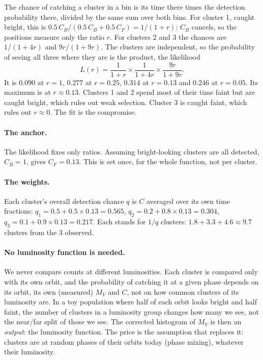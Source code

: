 \documentclass[11pt,a4paper]{article}
\newcommand{\MV}{M_V}
\begin{document}
The chance of catching a cluster in a bin is its time there times the detection probability there,
divided by the same sum over both bins. For cluster 1, caught bright, this is
$0.5\,C_B/(0.5\,C_B + 0.5\,C_F) = 1/(1+r)$: $C_B$ cancels, so the positions measure only the ratio
$r$. For clusters 2 and 3 the chances are $1/(1+4r)$ and $9r/(1+9r)$. The clusters are independent, so
the probability of seeing all three where they are is the product, the likelihood
\begin{equation}
L(r) = \frac{1}{1+r}\times\frac{1}{1+4r}\times\frac{9r}{1+9r}.
\end{equation}
It is $0.090$ at $r=1$, $0.277$ at $r=0.25$, $0.314$ at $r=0.13$ and $0.246$ at $r=0.05$. Its maximum
is at $r\approx0.13$. Clusters 1 and 2 spend most of their time faint but are caught bright, which
rules out weak selection. Cluster 3 is caught faint, which rules out $r\approx0$. The fit is the
compromise.

\paragraph{The anchor.} The likelihood fixes only ratios. Assuming bright-looking clusters are all
detected, $C_B=1$, gives $C_F = 0.13$. This is set once, for the whole function, not per cluster.

\paragraph{The weights.} Each cluster's overall detection chance $q$ is $C$ averaged over its own time
fractions: $q_1 = 0.5 + 0.5\times0.13 = 0.565$, $q_2 = 0.2 + 0.8\times0.13 = 0.304$,
$q_3 = 0.1 + 0.9\times0.13 = 0.217$. Each stands for $1/q$ clusters: $1.8 + 3.3 + 4.6 \approx 9.7$
clusters from the 3 observed.

\paragraph{No luminosity function is needed.} We never compare counts at different luminosities. Each
cluster is compared only with its own orbit, and the probability of catching it at a given phase
depends on its orbit, its own (measured) $\MV$ and $C$, not on how common clusters of its
luminosity are. In a toy population where half of each orbit looks bright and half faint, the number
of clusters in a luminosity group changes how many we see, not the near/far split of those we see.
The corrected histogram of $\MV$ is then an \emph{output}: the luminosity function. The price is the
assumption that replaces it: clusters are at random phases of their orbits today (phase mixing),
whatever their luminosity.
\end{document}
